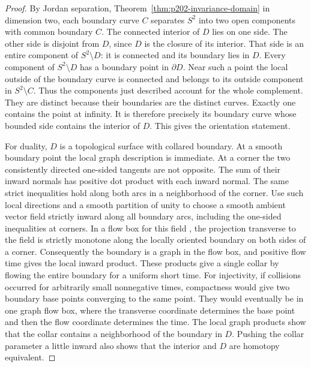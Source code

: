 \documentclass[11pt,oneside,openany]{book}
\theoremstyle{plain}
\theoremstyle{definition}
\theoremstyle{remark}
\begin{document}
\begin{proof}
By Jordan separation, Theorem~\ref{thm:p202-invariance-domain}
in dimension two, each boundary curve \(C\) separates \(S^2\)
into two open components with common boundary \(C\).
The connected interior of \(D\) lies on one side. The other
side is disjoint from \(D\), since \(D\) is the closure of its
interior. That side is an entire component of \(S^2\setminus D\):
it is connected and its boundary lies in \(D\).
Every component of \(S^2\setminus D\) has a boundary point in
\(\partial D\). Near such a point the local outside of the
boundary curve is connected and belongs to its outside component
in \(S^2\setminus C\). Thus the components just described account
for the whole complement. They are distinct because their
boundaries are the distinct curves. Exactly one contains the
point at infinity. It is therefore precisely its boundary
curve whose bounded side contains the interior of \(D\).
This gives the orientation statement.

For duality, \(D\) is a topological surface with collared boundary.
At a smooth boundary point the local graph description is
immediate. At a corner the two consistently directed one-sided
tangents are not opposite. The sum of their inward normals
has positive dot product with each inward normal. The same
strict inequalities hold along both arcs in a neighborhood of
the corner. Use such local directions and a smooth partition
of unity to choose a smooth ambient vector field strictly inward
along all boundary arcs, including the one-sided inequalities
at corners. In a flow box for this field
\cite[Theorem 6.5]{P104}, the projection transverse
to the field is strictly monotone along the locally oriented
boundary on both sides of a corner. Consequently the boundary is
a graph in the flow box, and positive flow time gives the local
inward product. These products give a single collar by flowing
the entire boundary for a uniform short time. For injectivity,
if collisions occurred for arbitrarily small nonnegative times,
compactness would give two boundary base points converging to the
same point. They would eventually be in one graph flow box, where
the transverse coordinate determines the base point and then the
flow coordinate determines the time. The local graph products show
that the collar contains a neighborhood of the boundary in \(D\).
Pushing the collar parameter a little inward also shows that the
interior and \(D\) are homotopy equivalent.


\end{proof}
\end{document}

